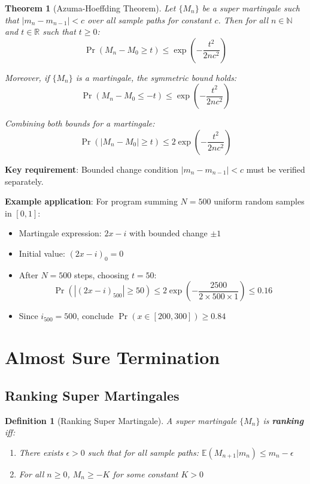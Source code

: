 \documentclass{article}
\newtheorem{definition}{Definition}
\newtheorem{theorem}{Theorem}
\begin{document}
\begin{theorem}[Azuma-Hoeffding Theorem]
Let $\{M_n\}$ be a super martingale such that $|m_n - m_{n-1}| < c$ over all sample paths for constant $c$. Then for all $n \in \mathbb{N}$ and $t \in \mathbb{R}$ such that $t \geq 0$:
\begin{equation}
\Pr(M_n - M_0 \geq t) \leq \exp\left(-\frac{t^2}{2nc^2}\right)
\end{equation}

Moreover, if $\{M_n\}$ is a martingale, the symmetric bound holds:
\begin{equation}
\Pr(M_n - M_0 \leq -t) \leq \exp\left(-\frac{t^2}{2nc^2}\right)
\end{equation}

Combining both bounds for a martingale:
\begin{equation}
\Pr(|M_n - M_0| \geq t) \leq 2\exp\left(-\frac{t^2}{2nc^2}\right)
\end{equation}
\end{theorem}

\textbf{Key requirement}: Bounded change condition $|m_n - m_{n-1}| < c$ must be verified separately.

\textbf{Example application}: For program summing $N = 500$ uniform random samples in $[0, 1]$:
\begin{itemize}
    \item Martingale expression: $2x - i$ with bounded change $\pm 1$
    \item Initial value: $(2x - i)_0 = 0$
    \item After $N = 500$ steps, choosing $t = 50$:
    \begin{equation}
    \Pr(|(2x - i)_{500}| \geq 50) \leq 2\exp\left(-\frac{2500}{2 \times 500 \times 1}\right) \leq 0.16
    \end{equation}
    \item Since $i_{500} = 500$, conclude $\Pr(x \in [200, 300]) \geq 0.84$
\end{itemize}

\section{Almost Sure Termination}

\subsection{Ranking Super Martingales}

\begin{definition}[Ranking Super Martingale]
A super martingale $\{M_n\}$ is \textbf{ranking} iff:
\begin{enumerate}
    \item There exists $\epsilon > 0$ such that for all sample paths: $\mathbb{E}(M_{n+1} | m_n) \leq m_n - \epsilon$

    \item For all $n \geq 0$, $M_n \geq -K$ for some constant $K > 0$
\end{enumerate}
\end{definition}
\end{document}
